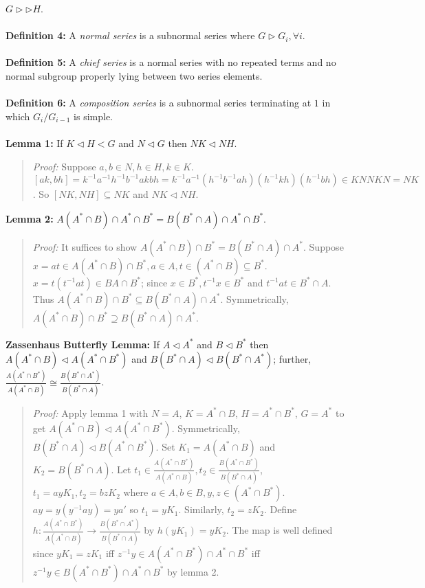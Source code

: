 $G \rhd \rhd H$.
\\
\\
{\bf Definition 4:}
A \emph{normal series} is a subnormal series where $G \rhd G_i, \forall i$.
\\
\\
{\bf Definition 5:}
A \emph{chief series} is a normal series with no repeated terms and no normal subgroup properly
lying between two series elements.  
\\
\\
{\bf Definition 6:}
A \emph{composition series} is a subnormal series 
terminating at $1$ in which $G_i/G_{i-1}$ is simple.
\\
\\
{\bf Lemma 1:} If $K \lhd H <G$ and $N \lhd G$ then $NK \lhd NH$.
\begin{quote}
\emph{Proof:}  
Suppose $a, b \in N, h \in H, k \in K$.
$[ak,bh]= 
k^{-1} a^{-1}h^{-1}b^{-1} ak bh= 
k^{-1} a^{-1} (h^{-1}b^{-1} a h) 
(h^{-1}kh) (h^{-1} bh) \in K N N K N = NK$.  So $[NK,NH] \subseteq NK$ and $NK \lhd NH$.
\end{quote}
{\bf Lemma 2:}
$A(A^* \cap B) \cap A^* \cap B^*= B(B^* \cap A) \cap A^* \cap B^*$.
\begin{quote}
\emph{Proof:}  
It suffices to show
$A(A^* \cap B) \cap B^*= B(B^* \cap A) \cap A^*$.
Suppose $x=at \in A(A^* \cap B) \cap B^* , a \in A, t \in (A^* \cap B) \subseteq B^*$.
$x= t (t^{-1}at) \in BA \cap B^*$; since $x \in B^*, t^{-1} x \in B^*$
and $t^{-1} a t \in B^* \cap A$. Thus 
$A(A^* \cap B) \cap B^* \subseteq B(B^* \cap A) \cap A^*$.
Symmetrically, $A(A^* \cap B) \cap B^* \supseteq B(B^* \cap A) \cap A^*$.
\end{quote}
{\bf Zassenhaus Butterfly Lemma:}  If
$A \triangleleft A^{*}$ and $B \triangleleft B^{*}$ then
$A(A^{*} \cap B) \triangleleft A(A^{*} \cap B^{*})$ and
$B(B^{*} \cap A) \triangleleft B(B^{*} \cap A^{*})$; further,
${\frac {A(A^{*} \cap B^{*})} {A(A^{*} \cap B) }} \cong
{\frac {B(B^{*} \cap A^{*})} {B(B^{*} \cap A) }}$.
\begin{quote}
\emph{Proof:}  
Apply lemma 1 with $N=A$, $K=A^* \cap B$, $H= A^* \cap B^*$, $G=A^*$ to get
$A(A^* \cap B) \lhd A(A^* \cap B^*)$.  Symmetrically,
$B(B^* \cap A) \lhd B(A^* \cap B^*)$.  
Set $K_1= A(A^* \cap B)$ and $K_2= B(B^* \cap A)$.  Let 
$t_1 \in {\frac {A(A^{*} \cap B^{*})} {A(A^{*} \cap B) }}, 
t_2 \in {\frac {B(A^{*} \cap B^{*})} {B(B^{*} \cap A) }}$, $t_1=ayK_1, t_2=bzK_2$ where
$a \in A, b \in B, y, z \in (A^* \cap B^*)$.
$ay= y (y^{-1}ay)= ya'$ so $t_1= yK_1$.  Similarly, $t_2= zK_2$.
Define $h:
{\frac {A(A^{*} \cap B^{*})} {A(A^{*} \cap B) }} \rightarrow
{\frac {B(B^{*} \cap A^{*})} {B(B^{*} \cap A) }}$ by $h(yK_1)= y K_2$.  The map is
well defined since $yK_1=zK_1$ iff $z^{-1}y \in A(A^* \cap B^*) \cap A^* \cap B^*$
iff
$z^{-1}y \in B(A^* \cap B^*) \cap A^* \cap B^*$ by lemma 2.
\end{quote}

